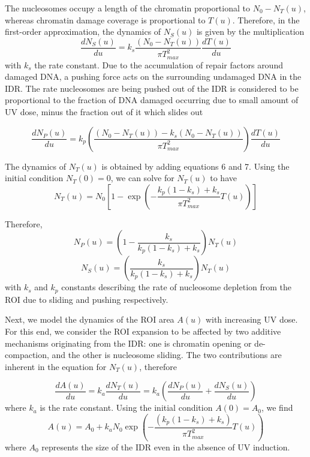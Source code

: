 \documentclass[12pt]{article}
\begin{document}
	The nucleosomes occupy a length of the chromatin proportional to $N_0-
	N_T(u)$, whereas chromatin damage coverage is proportional to $T(u)$. Therefore, in the first-order approximation, the dynamics of $N_S(u)$ is given by the multiplication
	\begin{equation*}
	\frac{dN_S(u)}{du} = k_s\frac{(N_0-N_T(u))}{\pi T_{max}^2}\frac{dT(u)}{du}	
	\end{equation*}
	with $k_s$ the rate constant. Due to the accumulation of repair factors around
	damaged DNA, a pushing force acts on the surrounding undamaged DNA in
	the IDR. The rate nucleosomes are being pushed out of the IDR is considered
	to be proportional to the fraction of DNA damaged occurring due to small amount of
	UV dose, minus the fraction out of it which slides out
	
	\begin{equation*}
    \frac{dN_P(u)}{du}=k_p\left(\frac{(N_0-N_T(u))-k_s(N_0-N_T(u))}{\pi T_{max}^2}\right)\frac{dT(u)}{du}
	\end{equation*}
	
	The dynamics of $N_T(u)$ is obtained by adding equations 6 and 7. Using
	the initial condition $N_T(0) = 0$, we can solve for $N_T(u)$ to have
	\begin{equation}\label{eq:totalNucleosomeLossIDR}
	N_T(u) = N_0\left[1-\exp\left(-\frac{k_p(1-k_s)+k_s}{\pi T_{max}^2}T(u)\right)\right]
	\end{equation}
	
	Therefore, 
	\begin{equation}\label{eq:nucleosomePush}
	N_P(u) = \left(1-\frac{k_s}{k_p(1-k_s)+k_s}\right)N_T(u)
	\end{equation}
	\begin{equation}\label{eq:nucleosomeSlide}
	N_S(u) = \left(\frac{k_s}{k_p(1-k_s)+k_s}\right)N_T(u)
	\end{equation}
	with $k_s$ and $k_p$ constants describing the rate of nucleosome depletion from
	the ROI due to sliding and pushing respectively.
	
	Next, we model the dynamics of the ROI area $A(u)$ with increasing UV
	dose. For this end, we consider the ROI expansion to be affected by two
	additive mechanisms originating from the IDR: one is chromatin opening or
	de-compaction, and the other is nucleosome sliding. The two contributions
	are inherent in the equation for $N_T(u)$, therefore
	
	\begin{equation*}
	\frac{dA(u)}{du}=k_a\frac{dN_T(u)}{du}=k_a\left(\frac{dN_P(u)}{du}+\frac{dN_S(u)}{du}\right)
	\end{equation*}
	where $k_a$ is the rate constant. Using the initial condition $A(0) = A_0$, we find
	\begin{equation}\label{eq:areaROI}
	A(u) = A_0+ k_aN_0\exp\left(-\frac{(k_p(1-k_s)+k_s)}{\pi T_{max}^2}T(u)\right)
	\end{equation}
	where $A_0$ represents the size of the IDR even in the absence of UV induction.
	
\end{document}

